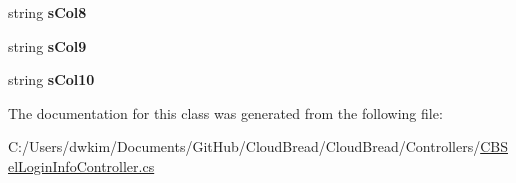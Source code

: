 \begin{DoxyCompactItemize}
\item 
string {\bfseries s\+Col8}\hypertarget{class_cloud_bread_1_1_controllers_1_1_c_b_sel_login_info_controller_1_1_model_a9eab54beeab9c4d066294f7974afb9b3}{}\label{class_cloud_bread_1_1_controllers_1_1_c_b_sel_login_info_controller_1_1_model_a9eab54beeab9c4d066294f7974afb9b3}

\item 
string {\bfseries s\+Col9}\hypertarget{class_cloud_bread_1_1_controllers_1_1_c_b_sel_login_info_controller_1_1_model_aa57cde6efb756aabd0e5adf63749ed33}{}\label{class_cloud_bread_1_1_controllers_1_1_c_b_sel_login_info_controller_1_1_model_aa57cde6efb756aabd0e5adf63749ed33}

\item 
string {\bfseries s\+Col10}\hypertarget{class_cloud_bread_1_1_controllers_1_1_c_b_sel_login_info_controller_1_1_model_a1d9b4f99280a13d4b82cfa22032f0b16}{}\label{class_cloud_bread_1_1_controllers_1_1_c_b_sel_login_info_controller_1_1_model_a1d9b4f99280a13d4b82cfa22032f0b16}

\end{DoxyCompactItemize}


The documentation for this class was generated from the following file\+:\begin{DoxyCompactItemize}
\item 
C\+:/\+Users/dwkim/\+Documents/\+Git\+Hub/\+Cloud\+Bread/\+Cloud\+Bread/\+Controllers/\hyperlink{_c_b_sel_login_info_controller_8cs}{C\+B\+Sel\+Login\+Info\+Controller.\+cs}\end{DoxyCompactItemize}
